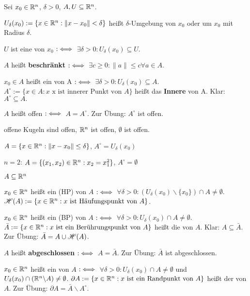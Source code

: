 \documentclass[a4paper,twoside,DIV15,BCOR12mm]{scrbook}
\begin{document}
\begin{definition}
Sei $x_0 \in \mathbb{R}^n$, $\delta > 0$, $A, U\subseteq \mathbb{R}^n$.
\begin{liste}
 \item $U_\delta(x_0) := \{ x \in \mathbb{R}^n: \|x-x_0\|<\delta\}$ heißt $\delta$-Umgebung von $x_0$ oder  um $x_0$ mit Radius $\delta$.
 \item $U$ ist eine  von $x_0$ $:\iff$ $\exists \delta > 0 : U_\delta(x_0) \subseteq U$.
 \item {}$A$ heißt \textbf{beschränkt} $:\iff$ $\exists c \ge 0: \|a\|\le c \forall a\in A$.
 \item $x_0\in A$ heißt ein  von A $:\iff$ $\exists \delta>0: U_\delta(x_0) \subseteq A$. \\
   $A^\circ:=\{ x\in A: x \text{ x ist innerer Punkt von }A\}$ heißt das \textbf{Innere} von A. Klar: $A^\circ\subseteq A.$
 \item $A$ heißt offen $:\iff$ $A=A^\circ$. Zur Übung: $A^\circ$ ist offen.
\end{liste}
\end{definition}

\begin{beispiele}
 \item offene Kugeln sind offen, $\mathbb{R}^n$ ist offen, $\emptyset$ ist offen.
 \item $A=\{x\in\mathbb{R}^n: \|x-x_0\|\le \delta\}$, $A^\circ = U_\delta(x_0)$
 \item $n=2$: $A=\{(x_1,x_2)\in\mathbb{R}^n: x_2 = x_1^2\}$, $A^\circ=\emptyset$
\end{beispiele}

\begin{definition}
 $A\subseteq \mathbb{R}^n$
 \begin{liste}
 \item $x_0\in \mathbb{R}^n$ heißt ein  (HP) von $A$ $:\iff$ $\forall \delta > 0: (U_\delta(x_0) \backslash \{x_0\}) \cap A \ne \emptyset$. $\mathscr{H}(A) := \{ x\in\mathbb{R}^n: x \text{ ist Häufungspunkt von } A\}$.
 \item  $x_0\in\mathbb{R}^n$ heißt ein  (BP) von $A$ $:\iff$ $\forall\delta>0: U_\delta(x_0) \cap A \ne \emptyset$. $\bar{A}:=\{x\in\mathbb{R}^n: x \text{ ist ein Berührungspunkt von } A\}$ heißt die  von $A$. Klar: $A\subseteq\bar{A}$. Zur Übung: $\bar{A} = A \cup \mathscr{H}(A)$.
 \item {}$A$ heißt \textbf{abgeschlossen} $:\iff$ $A=\bar{A}$. Zur Übung: $\bar{A}$ ist abgeschlossen.
 \item $x_0\in\mathbb{R}^n$ heißt ein  von $A$ $:\iff$ $\forall\delta>0: U_\delta(x_0) \cap A \ne \emptyset$ und $U_\delta(x_0) \cap (\mathbb{R}^n\backslash A) \ne \emptyset$. $\partial A := \{x\in\mathbb{R}^n: x \text{ ist ein Randpunkt von } A \}$ heißt der  von $A$. Zur Übung: $\partial A = \bar{A}\backslash A^\circ$.
 \end{liste}
\end{definition}
\end{document}
